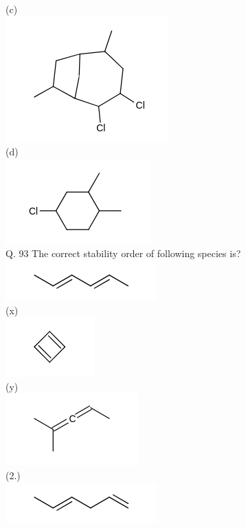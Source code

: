 \documentclass[10pt]{article}
\begin{document}
(c)\\
\includegraphics{smile-160e320ba0bc19deaeae985c7784563fa34d29a6}\\
(d)\\
\includegraphics{smile-35aa5e98d054cb20eeee507bd1872cc5cc921cbc}\\
Q. 93 The correct stability order of following species is?\\
\includegraphics{smile-768991adbf79f710e26583792b4bfd5d96355b44}\\
(x)\\
\includegraphics{smile-fbb39b01e96a597939f6d6ecea7a22c836331f7a}\\
(y)\\
\includegraphics{smile-3d4c06b53ad5e84fe1f8e425ab9ecfad4782598f}\\
(2.)\\
\includegraphics{smile-e4add0528d202b42aa42ef56417a03ff7565befd}\\
\end{document}
